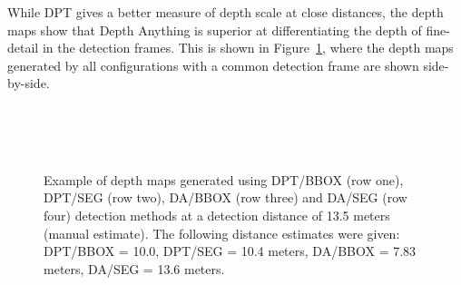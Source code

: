 While DPT gives a better measure of depth scale at close distances, the depth maps show that
Depth Anything is superior at differentiating the depth of fine-detail in the detection frames.
This is shown in Figure~\ref{fig:fine_detail}, where the depth maps generated by all
configurations with a common detection frame are shown side-by-side.


\begin{figure}[H]
    \centering
    \\[1mm]
    \\[1mm]
    \\[1mm]
    \caption{Example of depth maps generated using DPT/BBOX (row one), DPT/SEG
        (row two), DA/BBOX (row three) and DA/SEG (row four) detection methods at a detection
        distance of 13.5 meters (manual estimate). The following distance estimates were given:
        DPT/BBOX = 10.0, DPT/SEG = 10.4 meters, DA/BBOX = 7.83 meters, DA/SEG = 13.6 meters.}
    \label{fig:fine_detail}
\end{figure}

